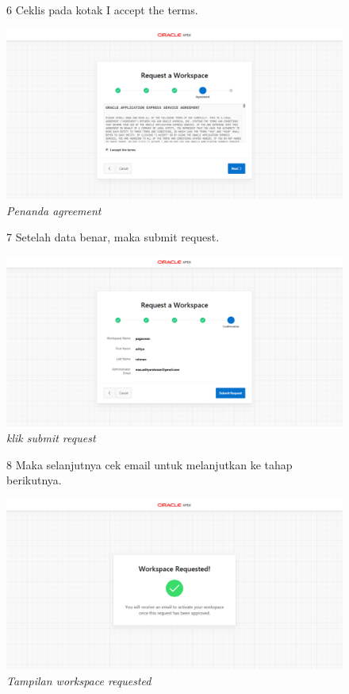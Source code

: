 \begin{enumerate}
\begin{figure}[!htbp]
\item[6] Ceklis pada kotak I accept the terms.
	\begin{center}
	\includegraphics[scale=0.2]{figures/tahap5.png}
	\caption{\textit{Penanda agreement}}
	\end{center}	 
\end{figure}

\begin{figure}[!htbp]
\item[7] Setelah data benar, maka submit request.
	\begin{center}
	\includegraphics[scale=0.2]{figures/tahap6.png}
	\caption{\textit{klik submit request}}
	\end{center}	 
\end{figure}

\begin{figure}[!htbp]
\item[8] Maka selanjutnya cek email untuk melanjutkan ke tahap berikutnya.
	\begin{center}
	\includegraphics[scale=0.2]{figures/tahap7.png}
	\caption{\textit{Tampilan workspace requested}}
	\end{center}	 
\end{figure}


\end{enumerate}
